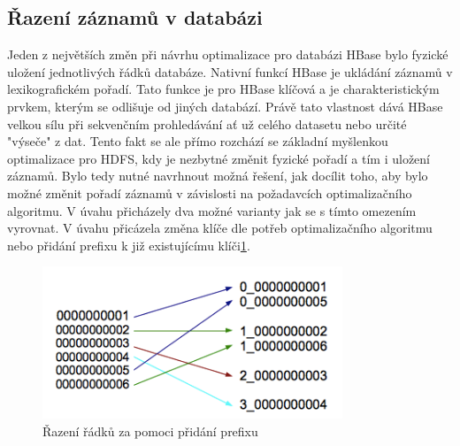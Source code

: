 \documentclass[thesis=M,czech]{FITthesis}[2012/06/26]
\begin{document}
\subsection{Řazení záznamů v databázi}
Jeden z největších změn při návrhu optimalizace pro databázi HBase bylo fyzické uložení jednotlivých řádků databáze. Nativní funkcí HBase je ukládání záznamů v lexikografickém pořadí. Tato funkce je pro HBase klíčová a je charakteristickým prvkem, kterým se odlišuje od jiných databází. Právě tato vlastnost dává HBase velkou sílu při sekvenčním prohledávání ať už celého datasetu nebo určité "výseče" z dat. Tento fakt se ale přímo rozchází se základní myšlenkou optimalizace pro HDFS, kdy je nezbytné změnit fyzické pořadí a tím i uložení záznamů. Bylo tedy nutné navrhnout možná řešení, jak docílit toho, aby bylo možné změnit pořadí záznamů v závislosti na požadavcích optimalizačního algoritmu. V úvahu přicházely dva možné varianty jak se s tímto omezením vyrovnat. V úvahu přicázela změna klíče dle potřeb optimalizačního algoritmu nebo přidání prefixu k již existujícímu klíči\ref{fig:keys}.

\begin{figure}\centering
	\includegraphics[width=0.8\textwidth, angle=0]{files/rows}
	\caption[Řazení řádků za pomoci přidání prefixu]
	{Řazení řádků za pomoci přidání prefixu}\label{fig:keys}
\end{figure} 
\end{document}
